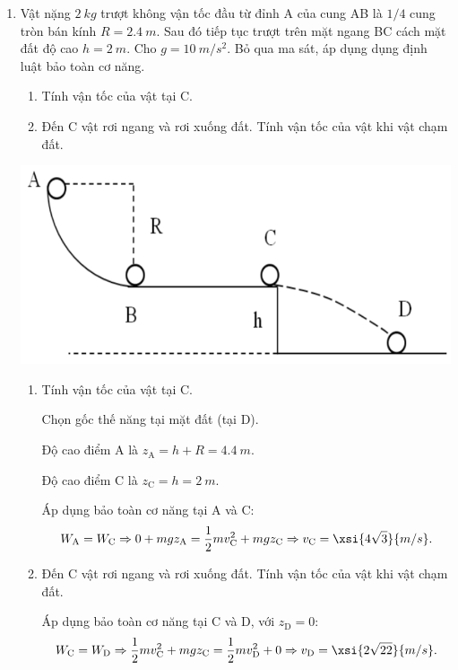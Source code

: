\begin{enumerate}[label=\bfseries Câu \arabic*:, leftmargin=1.5cm]
	\item {}
	
	
	{
		Vật nặng $\SI{2}{kg}$ trượt không vận tốc đầu từ đỉnh A của cung AB là $1/4$ cung tròn bán kính $R=\SI{2.4}{m}$. Sau đó tiếp tục trượt trên mặt ngang BC cách mặt đất độ cao $h=\SI{2}{m}$. Cho $g=\SI{10}{m/s^2}$. Bỏ qua ma sát, áp dụng dụng định luật bảo toàn cơ năng.
		\begin{enumerate}[label=\alph*)]
			\item Tính vận tốc của vật tại C.
			\item Đến C vật rơi ngang và rơi xuống đất. Tính vận tốc của vật khi vật chạm đất.
		\end{enumerate}
		\begin{center}
			\includegraphics[scale=0.4]{../figs/VN10-2022-PH-TP029-4}
		\end{center}
	}
	
	\hideall
	{	
		\begin{enumerate}[label=\alph*)]
			\item Tính vận tốc của vật tại C.
			
			Chọn gốc thế năng tại mặt đất (tại D).
			
			Độ cao điểm A là $z_\text{A} = h + R = \SI{4.4}{m}$.
			
			Độ cao điểm C là $z_\text{C} = h = \SI{2}{m}$.
			
			Áp dụng bảo toàn cơ năng tại A và C:
			$$W_\text{A} = W_\text{C} \Rightarrow 0 + mgz_\text A = \dfrac{1}{2}mv_\text{C}^2 + mgz_\text{C} \Rightarrow v_\text{C} = \xsi{4\sqrt 3}{m/s}.$$
			
			\item Đến C vật rơi ngang và rơi xuống đất. Tính vận tốc của vật khi vật chạm đất.
			
			Áp dụng bảo toàn cơ năng tại C và D, với $z_\text{D} = 0$:
			$$W_\text{C} = W_\text{D} \Rightarrow \dfrac{1}{2}mv_\text{C}^2 + mgz_\text{C} = \dfrac{1}{2} mv_\text{D}^2 + 0 \Rightarrow v_\text{D} = \xsi{2\sqrt{22}}{m/s}.$$
		\end{enumerate}
	}
	

\end{enumerate}
